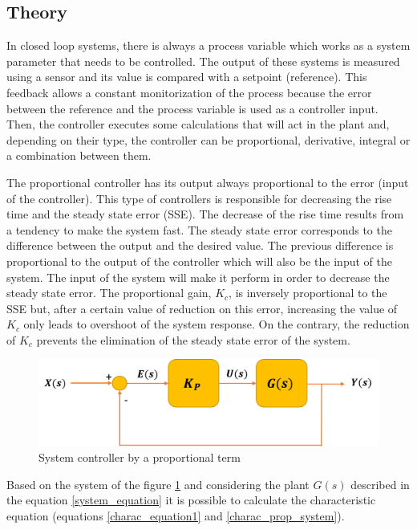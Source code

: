 \subsection{Theory}

In closed loop systems, there is always a process variable which works as a system parameter that needs to be controlled. The output of these systems is measured using a sensor and its value is compared with a setpoint (reference). This feedback allows a constant monitorization of the process because the error between the reference and the process variable is used as a controller input. Then, the controller executes some calculations that will act in the plant and, depending on their type, the controller can be proportional, derivative, integral or a combination between them.

The proportional controller has its output always proportional to the error (input of the controller). This type of controllers is responsible for decreasing the rise time and the steady state error (SSE). The decrease of the rise time results from a tendency to make the system fast. The steady state error corresponds to the difference between the output and the desired value. The previous difference is proportional to the output of the controller which will also be the input of the system. The input of the system will make it perform in order to decrease the steady state error. The proportional gain, $K_c$, is inversely proportional to the SSE but, after a certain value of reduction on this error, increasing the value of $K_c$ only leads to overshoot of the system response. On the contrary, the reduction of $K_c$ prevents the elimination of the steady state error of the system. 

\begin{figure}[H]
	\centering
	\includegraphics[scale=0.6]{figures/propor_controller.png}
	\caption{System controller by a proportional term}
	\label{propor_controller}
\end{figure}

Based on the system of the figure \ref{propor_controller} and considering the plant $G(s)$ described in the equation \ref{system_equation} it is possible to calculate the characteristic equation (equations \ref{charac_equation1} and \ref{charac_prop_system}).

